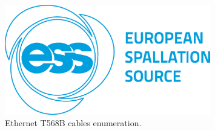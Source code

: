 \documentclass[11pt
  , a4paper
  , article
  , oneside
  , showtrims
]{memoir}
\begin{document}
\begin{figure}[!htb]
	\centering
	\includegraphics[width=0.80\textwidth]{./figs/ESS_Logo_Frugal_Blue_cmyk.eps}
	\caption{
		Ethernet T568B cables enumeration\cite{CSTIAEIA}.
	}
	\label{fig:ser_cable}   
\end{figure}
\end{document}

